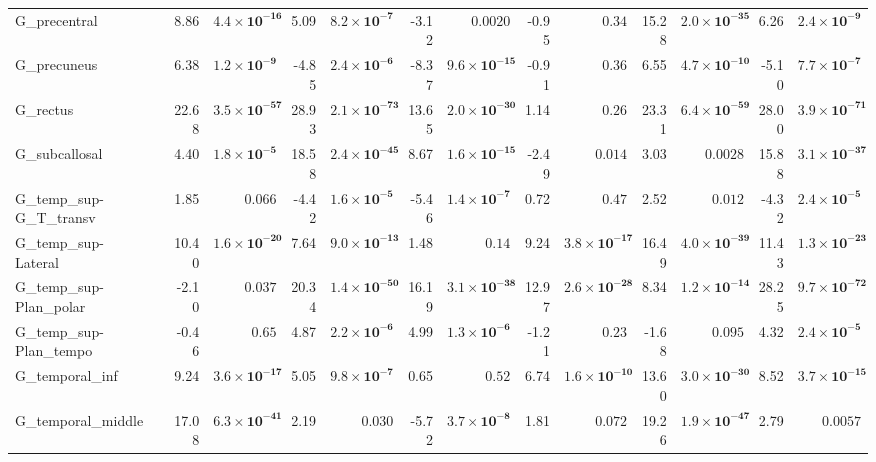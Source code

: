 {\begin{longtable}{llrrrrrrrrrrrr}
G\_precentral &  & 8.86 & $\mathbf{4.4{\times}10^{-16}}$ & 5.09 & $\mathbf{8.2{\times}10^{-7}}$ & -3.12 & $0.0020$ & -0.95 & $0.34$ & 15.28 & $\mathbf{2.0{\times}10^{-35}}$ & 6.26 & $\mathbf{2.4{\times}10^{-9}}$ \\
G\_precuneus &  & 6.38 & $\mathbf{1.2{\times}10^{-9}}$ & -4.85 & $\mathbf{2.4{\times}10^{-6}}$ & -8.37 & $\mathbf{9.6{\times}10^{-15}}$ & -0.91 & $0.36$ & 6.55 & $\mathbf{4.7{\times}10^{-10}}$ & -5.10 & $\mathbf{7.7{\times}10^{-7}}$ \\
G\_rectus &  & 22.68 & $\mathbf{3.5{\times}10^{-57}}$ & 28.93 & $\mathbf{2.1{\times}10^{-73}}$ & 13.65 & $\mathbf{2.0{\times}10^{-30}}$ & 1.14 & $0.26$ & 23.31 & $\mathbf{6.4{\times}10^{-59}}$ & 28.00 & $\mathbf{3.9{\times}10^{-71}}$ \\
G\_subcallosal &  & 4.40 & $\mathbf{1.8{\times}10^{-5}}$ & 18.58 & $\mathbf{2.4{\times}10^{-45}}$ & 8.67 & $\mathbf{1.6{\times}10^{-15}}$ & -2.49 & $0.014$ & 3.03 & $0.0028$ & 15.88 & $\mathbf{3.1{\times}10^{-37}}$ \\
G\_temp\_sup-G\_T\_transv &  & 1.85 & $0.066$ & -4.42 & $\mathbf{1.6{\times}10^{-5}}$ & -5.46 & $\mathbf{1.4{\times}10^{-7}}$ & 0.72 & $0.47$ & 2.52 & $0.012$ & -4.32 & $\mathbf{2.4{\times}10^{-5}}$ \\
G\_temp\_sup-Lateral &  & 10.40 & $\mathbf{1.6{\times}10^{-20}}$ & 7.64 & $\mathbf{9.0{\times}10^{-13}}$ & 1.48 & $0.14$ & 9.24 & $\mathbf{3.8{\times}10^{-17}}$ & 16.49 & $\mathbf{4.0{\times}10^{-39}}$ & 11.43 & $\mathbf{1.3{\times}10^{-23}}$ \\
G\_temp\_sup-Plan\_polar &  & -2.10 & $0.037$ & 20.34 & $\mathbf{1.4{\times}10^{-50}}$ & 16.19 & $\mathbf{3.1{\times}10^{-38}}$ & 12.97 & $\mathbf{2.6{\times}10^{-28}}$ & 8.34 & $\mathbf{1.2{\times}10^{-14}}$ & 28.25 & $\mathbf{9.7{\times}10^{-72}}$ \\
G\_temp\_sup-Plan\_tempo &  & -0.46 & $0.65$ & 4.87 & $\mathbf{2.2{\times}10^{-6}}$ & 4.99 & $\mathbf{1.3{\times}10^{-6}}$ & -1.21 & $0.23$ & -1.68 & $0.095$ & 4.32 & $\mathbf{2.4{\times}10^{-5}}$ \\
G\_temporal\_inf &  & 9.24 & $\mathbf{3.6{\times}10^{-17}}$ & 5.05 & $\mathbf{9.8{\times}10^{-7}}$ & 0.65 & $0.52$ & 6.74 & $\mathbf{1.6{\times}10^{-10}}$ & 13.60 & $\mathbf{3.0{\times}10^{-30}}$ & 8.52 & $\mathbf{3.7{\times}10^{-15}}$ \\
G\_temporal\_middle &  & 17.08 & $\mathbf{6.3{\times}10^{-41}}$ & 2.19 & $0.030$ & -5.72 & $\mathbf{3.7{\times}10^{-8}}$ & 1.81 & $0.072$ & 19.26 & $\mathbf{1.9{\times}10^{-47}}$ & 2.79 & $0.0057$ \\

\end{longtable}}
